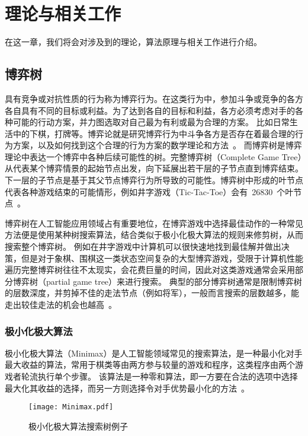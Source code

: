 \chapter{理论与相关工作}
\label{chap:theory}
在这一章，我们将会对涉及到的理论，算法原理与相关工作进行介绍。
\section{博弈树}
具有竞争或对抗性质的行为称为博弈行为。在这类行为中，参加斗争或竞争的各方各自具有不同的目标或利益。为了达到各自的目标和利益，各方必须考虑对手的各种可能的行动方案，并力图选取对自己最为有利或最为合理的方案。
比如日常生活中的下棋，打牌等。博弈论就是研究博弈行为中斗争各方是否存在着最合理的行为方案，以及如何找到这个合理的行为方案的数学理论和方法~\cite{gt}。
而博弈树是博弈理论中表达一个博弈中各种后续可能性的树。完整博弈树（Complete Game Tree）从代表某个博弈情景的起始节点出发，向下延展出若干层的子节点直到博弈结束。
下一层的子节点是基于其父节点博弈行为所导致的可能性。博弈树中形成的叶节点代表各种游戏结束的可能情形，例如井字游戏（Tic-Tac-Toe）会有~26830~个叶节点~\cite{NAU1982257,allis1994searching}。


博弈树在人工智能应用领域占有重要地位，在博弈游戏中选择最佳动作的一种常见方法便是使用某种树搜索算法，结合类似于极小化极大算法的规则来修剪树，从而搜索整个博弈树。
例如在井字游戏中计算机可以很快速地找到最佳解并做出决策，但是对于象棋、围棋这一类状态空间复杂的大型博弈游戏，受限于计算机性能遍历完整博弈树往往不太现实，会花费巨量的时间，因此对这类游戏通常会采用部分博弈树（partial game tree）来进行搜索。
典型的部分博弈树通常是限制博弈树的层数深度，并剪掉不佳的走法节点（例如将军），一般而言搜索的层数越多，能走出较佳走法的机会也越高~\cite{coin12162}。

\subsection{极小化极大算法}
极小化极大算法（Minimax）是人工智能领域常见的搜索算法，是一种最小化对手最大收益的算法，常用于棋类等由两方参与较量的游戏和程序，这类程序由两个游戏者轮流执行单个步骤。
该算法是一种零和算法，即一方要在合法的选项中选择最大化其收益的选择，而另一方则选择令对手优势最小化的方法~\cite{ctt1r2gkx}。

\begin{figure}[htb]
    \centering
    \texttt{[image: Minimax.pdf]}
    \caption[minimax]{%
      极小化极大算法搜索树例子~\cite{wikiMinimax}%
      }
    \label{fig:minimax}
  \end{figure}

